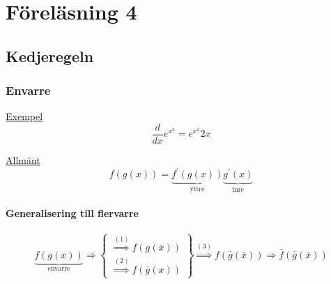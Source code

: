 \documentclass{article}
\begin{document}
\newpage
\section{Föreläsning 4}
\subsection{Kedjeregeln}

\subsubsection*{Envarre}

\underline{Exempel} \[\frac{d}{dx} e^{x^2} = e^{x^2}2x\]

\underline{Allmänt} \[f(g(x)) = \underbrace{f^{\prime}(g(x))}_{\text{yttre}} \underbrace{g^{\prime}(x)}_{\text{inre}} \]

\paragraph{Generalisering till flervarre}

\[
	\underbrace{f(g(x))}_{\text{envarre}} \Rightarrow \left\{\begin{array}{rcl}
	\overset{(1)}{\Rightarrow} f(g(\bar{x})) \\
	\overset{(2)}{\Rightarrow} f(\bar{g}(x))
	\end{array}\right\}
	\overset{(3)}{\Rightarrow} f(\bar{g}(\bar{x})) \Rightarrow \bar{f}(\bar{g}(\bar{x}))
\]
\end{document}
